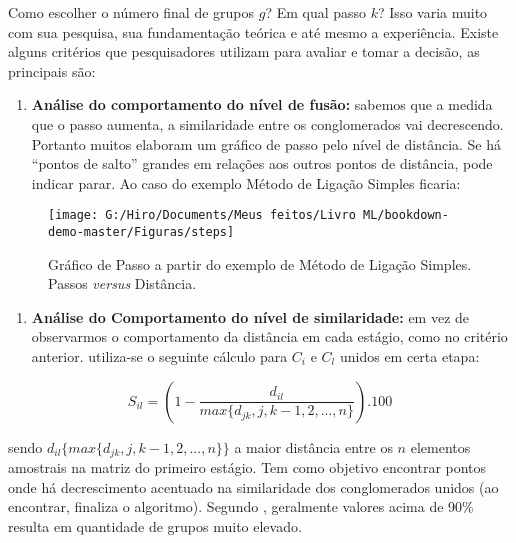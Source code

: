 \documentclass[
]{book}
\providecommand{\tightlist}{%
  \setlength{\itemsep}{0pt}\setlength{\parskip}{0pt}}
\begin{document}
Como escolher o número final de grupos \(g\)? Em qual passo \(k\)? Isso varia muito com sua pesquisa, sua fundamentação teórica e até mesmo a experiência. Existe alguns critérios que pesquisadores utilizam para avaliar e tomar a decisão, as principais são:

\begin{enumerate}
\def\labelenumi{\arabic{enumi}.}
\tightlist
\item
  \textbf{Análise do comportamento do nível de fusão:} sabemos que a medida que o passo aumenta, a similaridade entre os conglomerados vai decrescendo. Portanto muitos elaboram um gráfico de passo pelo nível de distância. Se há ``pontos de salto'' grandes em relações aos outros pontos de distância, pode indicar parar. Ao caso do exemplo Método de Ligação Simples ficaria:
\end{enumerate}

\begin{figure}

{\centering \texttt{[image: G:/Hiro/Documents/Meus feitos/Livro ML/bookdown-demo-master/Figuras/steps]} 

}

\caption{Gráfico de Passo a partir do exemplo de Método de Ligação Simples. Passos \emph{versus} Distância.}\label{fig:steps}
\end{figure}



\begin{enumerate}
\def\labelenumi{\arabic{enumi}.}
\setcounter{enumi}{1}
\tightlist
\item
  \textbf{Análise do Comportamento do nível de similaridade:} em vez de observarmos o comportamento da distância em cada estágio, como no critério anterior. utiliza-se o seguinte cálculo para \(C_i\) e \(C_l\) unidos em certa etapa:
\end{enumerate}

\begin{equation}
S_{il}=(1-\frac{d_{il}}{max\{d_{jk},j,k-1,2,...,n\}}).100
 \label{eq:critsimi}
\end{equation}

sendo \(d_{il}\{max\{d_{jk},j,k-1,2,...,n\}\}\) a maior distância entre os \(n\) elementos amostrais na matriz do primeiro estágio. Tem como objetivo encontrar pontos onde há decrescimento acentuado na similaridade dos conglomerados unidos (ao encontrar, finaliza o algoritmo). Segundo \citet{felix2004}, geralmente valores acima de 90\% resulta em quantidade de grupos muito elevado.
\end{document}
